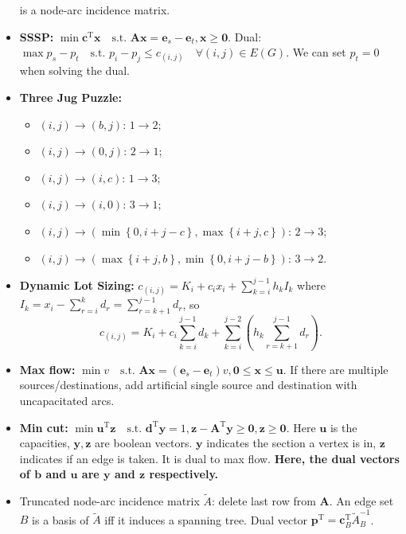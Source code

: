 \documentclass[10pt]{article}
\begin{document}
\begin{multicols*}{3}
\begin{itemize}
            is a node-arc incidence matrix.
            \item \textbf{SSSP:} $\min \bm{c}^{\mathrm{T}}\bm{x} \quad \textrm{s.t. } \bm{Ax} = \bm{e}_s - \bm{e}_t, \bm{x} \geq \mathbf{0}$. Dual: $\max p_s - p_t \quad \textrm{s.t. }p_i - p_j \leq c_{(i, j)} \quad \forall (i, j) \in E(G)$. We can set $p_t = 0$ when solving the dual.
            \item \textbf{Three Jug Puzzle: }
            \begin{itemize}
                \item $(i, j) \to (b, j)$: $1 \to 2$;
                \item $(i, j) \to (0, j)$: $2 \to 1$;
                \item $(i, j) \to (i, c)$: $1 \to 3$;
                \item $(i, j) \to (i, 0)$: $3 \to 1$;
                \item $(i, j) \to \left(\min\left\{0, i + j - c\right\}, \max\left\{i + j, c\right\}\right)$: $2 \to 3$;
                \item $(i, j) \to \left(\max\left\{i + j, b\right\}, \min\left\{0, i + j - b\right\}\right)$: $3 \to 2$.
            \end{itemize}
            \item \textbf{Dynamic Lot Sizing: } $c_{(i, j)} = K_i + c_ix_i + \sum_{k = i}^{j - 1}h_kI_k$ where $I_k = x_i - \sum_{r = i}^{k}d_r = \sum_{r = k + 1}^{j - 1}d_r$, so 
            \begin{equation*}
                c_{(i, j)} = K_i + c_i\sum_{k = i}^{j - 1}d_k + \sum_{k = i}^{j - 2}\left(h_k\sum_{r = k + 1}^{j - 1}d_r\right).
            \end{equation*}
            \item \textbf{Max flow:} $\min v \quad \textrm{s.t. } \bm{Ax} = (\bm{e}_s - \bm{e}_t)v, \mathbf{0} \leq \bm{x} \leq \bm{u}$. If there are multiple sources/destinations, add artificial single source and destination with uncapacitated arcs.
            \item \textbf{Min cut:} $\min\bm{u}^{\mathrm{T}}\bm{z} \quad \textrm{s.t. } \bm{d}^{\mathrm{T}}\bm{y} = 1, \bm{z} - \bm{A}^{\mathrm{T}}\bm{y}\geq \mathbf{0}, \bm{z} \geq \mathbf{0}$. Here $\bm{u}$ is the capacities, $\bm{y}, \bm{z}$ are boolean vectors. $\bm{y}$ indicates the section a vertex is in, $\bm{z}$ indicates if an edge is taken. It is dual to max flow. \textbf{Here, the dual vectors of $\bm{b}$ and $\bm{u}$ are $\bm{y}$ and $\bm{z}$ respectively.}
            \item Truncated node-arc incidence matrix $\widetilde{A}$: delete last row from $\bm{A}$. An edge set $B$ is a basis of $\widetilde{A}$ iff it induces a spanning tree. Dual vector $\bm{p}^{\mathrm{T}} = \bm{c}^{\mathrm{T}}_B\widetilde{A}_B^{-1}$.

\end{itemize}
\end{multicols*}
\end{document}
